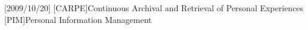 
\usepackage{rotating}
\newcommand*{\rotatedcolheader}[1]{\begin{sideways}#1\end{sideways}}

\usepackage{acronym}[2009/10/20]
[CARPE]{Continuous Archival and Retrieval of Personal
  Experiences}
[PIM]{Personal Information Management}

\newcommand{\onlinevsprint}[2]{#2}

\setcounter{tocdepth}{2}

\makeatletter%
\renewcommand*{\@tocrmarg}{3em}
\renewcommand*{\@pnumwidth}{2em}
\makeatother%

\makeatletter
\renewcommand\section{\@startsection{section}{1}{\z@}%
  {-2.5ex \@plus -.5ex \@minus -.2ex}%
  {1.8ex \@plus.2ex}%
  {\setlength{\parfillskip}{\z@ \@plus 1fil}%
    \raggedsection\normalfont\sectfont\nobreak\size@section\nobreak}}
\renewcommand\subsection{\@startsection{subsection}{2}{\z@}%
  {-.8ex\@plus -.5ex \@minus -.2ex}%
  {1.3ex \@plus .2ex}%
  {\setlength{\parfillskip}{\z@ \@plus 1fil}%
    \raggedsection\normalfont\sectfont\nobreak\size@subsection\nobreak}}
\renewcommand\subsubsection{\@startsection{subsubsection}{3}{\z@}%
  {-.5ex\@plus -.3ex \@minus -0ex}%
  {.8ex \@plus .2ex}%
  {\setlength{\parfillskip}{\z@ \@plus 1fil}%
    \raggedsection\normalfont\sectfont\nobreak\size@subsubsection\nobreak}}
\renewcommand\paragraph{\@startsection{paragraph}{4}{\z@}%
  {-0ex \@plus -.5ex \@minus -0ex}%
  {-1em}%
  {\setlength{\parfillskip}{\z@ \@plus 1fil}%
    \raggedsection\normalfont\sectfont\size@paragraph}}
\makeatother

